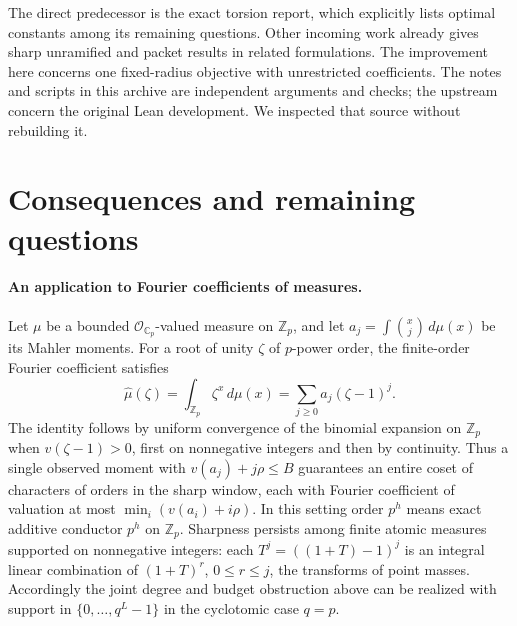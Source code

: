 \documentclass[11pt]{article}
\begin{document}
The direct predecessor is the 
{exact torsion report}, which explicitly lists optimal constants among
its remaining questions. Other incoming work already gives sharp
unramified and packet results in related formulations. The improvement
here concerns one fixed-radius objective with unrestricted coefficients.
The notes and scripts in this archive are independent arguments and
checks; the upstream  concern the
original Lean development. We inspected that source without rebuilding it.




\clearpage
\section{Consequences and remaining questions}
\paragraph{An application to Fourier coefficients of measures.}
Let $\mu$ be a bounded $\mathcal O_{\mathbb C_p}$-valued measure on
$\mathbb Z_p$, and let $a_j=\int\binom{x}{j}\,d\mu(x)$ be its
Mahler moments. For a root of unity $\zeta$ of $p$-power order,
the finite-order Fourier coefficient satisfies
\[
       \widehat\mu(\zeta)=\int_{\mathbb Z_p}\zeta^x\,d\mu(x)
            =\sum_{j\ge0}a_j(\zeta-1)^j .
\]
The identity follows by uniform convergence of the binomial expansion
on $\mathbb Z_p$ when $v(\zeta-1)>0$, first on nonnegative integers
and then by continuity. Thus a single observed moment with
$v(a_j)+j\rho\le B$ guarantees an entire coset of characters of
orders in the sharp window, each with Fourier coefficient of valuation
at most $\min_i(v(a_i)+i\rho)$. In this setting order $p^h$ means
exact additive conductor $p^h$ on $\mathbb Z_p$.
Sharpness persists among finite atomic measures supported on nonnegative
integers: each $T^j=((1+T)-1)^j$ is an integral linear combination
of $(1+T)^r$, $0\le r\le j$, the transforms of point masses.
Accordingly the joint degree and budget obstruction above can be
realized with support in $\{0,\ldots,q^L-1\}$ in the cyclotomic
case $q=p$.
\end{document}
